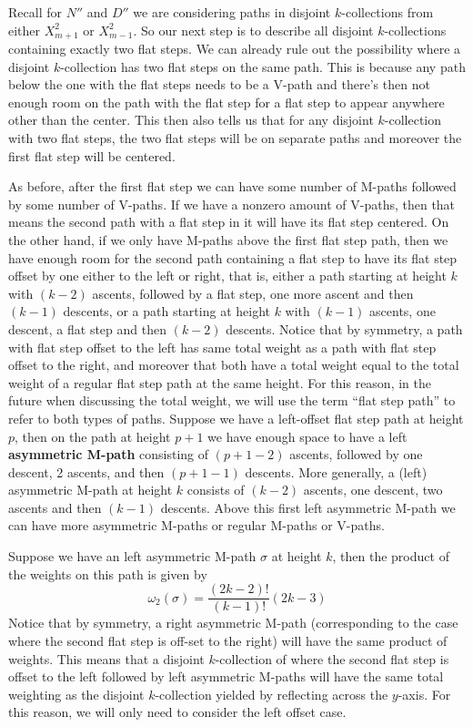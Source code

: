 \documentclass[11pt]{article}
\theoremstyle{mythm}
\begin{document}
Recall for $N''$ and $D''$ we are considering paths in disjoint $k$-collections from either $X_{m+1}^2$ or $X_{m-1}^2$. So our next step is to describe all disjoint $k$-collections containing exactly two flat steps. We can already rule out the possibility where a disjoint $k$-collection has two flat steps on the same path. This is because any path below the one with the flat steps needs to be a V-path and there's then not enough room on the path with the flat step for a flat step to appear anywhere other than the center. This then also tells us that for any disjoint $k$-collection with two flat steps, the two flat steps will be on separate paths and moreover the first flat step will be centered.

As before, after the first flat step we can have some number of M-paths followed by some number of V-paths. If we have a nonzero amount of V-paths, then that means the second path with a flat step in it will have its flat step centered. On the other hand, if we only have M-paths above the first flat step path, then we have enough room for the second path containing a flat step to have its flat step offset by one either to the left or right, that is, either a path starting at height $k$ with $(k-2)$ ascents, followed by a flat step, one more ascent and then $(k-1)$ descents, or a path starting at height $k$ with $(k-1)$ ascents, one descent, a flat step and then $(k-2)$ descents. Notice that by symmetry, a path with flat step offset to the left has same total weight as a path with flat step offset to the right, and moreover that both have a total weight  equal to the total weight of a regular flat step path at the same height. For this reason, in the future when discussing the total weight, we will use the term ``flat step path'' to refer to both types of paths. Suppose we have a left-offset flat step path at height $p$, then on the path at height $p+1$ we have enough space to have a left \textbf{asymmetric M-path} consisting of $(p+1-2)$ ascents, followed by one descent, 2 ascents, and then $(p+1-1)$ descents. More generally, a (left) asymmetric M-path at height $k$ consists of $(k-2)$ ascents, one descent, two ascents and then $(k-1)$ descents. Above this first left asymmetric M-path we can have more asymmetric M-paths or regular M-paths or V-paths.

Suppose we have an left asymmetric M-path $\sigma$ at height $k$, then the product of the weights on this path is given by
\begin{equation*}
\omega_2(\sigma) = \frac{(2k-2)!}{(k-1)!}(2k-3)
\end{equation*}
Notice that by symmetry, a right asymmetric M-path (corresponding to the case where the second flat step is off-set to the right) will have the same product of weights. This means that a disjoint $k$-collection of where the second flat step is offset to the left followed by left asymmetric M-paths will have the same total weighting as the disjoint $k$-collection yielded by reflecting across the $y$-axis. For this reason, we will only need to consider the left offset case.
\end{document}
